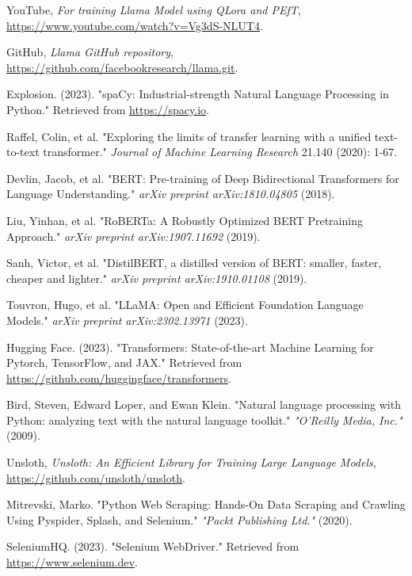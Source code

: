 \documentclass[conference]{IEEEtran}
\begin{document}
\begin{thebibliography}{1}
    YouTube, \emph{For training Llama Model using QLora and PEfT}, \href{https://www.youtube.com/watch?v=Vg3dS-NLUT4}{https://www.youtube.com/watch?v=Vg3dS-NLUT4}.

    GitHub, \emph{Llama GitHub repository}, \href{https://github.com/facebookresearch/llama.git}{https://github.com/facebookresearch/llama.git}.

    Explosion. (2023). "spaCy: Industrial-strength Natural Language Processing in Python." Retrieved from \url{https://spacy.io}.

    Raffel, Colin, et al. "Exploring the limits of transfer learning with a unified text-to-text transformer." \emph{Journal of Machine Learning Research} 21.140 (2020): 1-67.

    Devlin, Jacob, et al. "BERT: Pre-training of Deep Bidirectional Transformers for Language Understanding." \emph{arXiv preprint arXiv:1810.04805} (2018).

    Liu, Yinhan, et al. "RoBERTa: A Robustly Optimized BERT Pretraining Approach." \emph{arXiv preprint arXiv:1907.11692} (2019).

    Sanh, Victor, et al. "DistilBERT, a distilled version of BERT: smaller, faster, cheaper and lighter." \emph{arXiv preprint arXiv:1910.01108} (2019).

    Touvron, Hugo, et al. "LLaMA: Open and Efficient Foundation Language Models." \emph{arXiv preprint arXiv:2302.13971} (2023).

    Hugging Face. (2023). "Transformers: State-of-the-art Machine Learning for Pytorch, TensorFlow, and JAX." Retrieved from \url{https://github.com/huggingface/transformers}.

    Bird, Steven, Edward Loper, and Ewan Klein. "Natural language processing with Python: analyzing text with the natural language toolkit." \emph{"O'Reilly Media, Inc."} (2009).

    Unsloth, \emph{Unsloth: An Efficient Library for Training Large Language Models}, \href{https://github.com/unsloth/unsloth}{https://github.com/unsloth/unsloth}.

    Mitrevski, Marko. "Python Web Scraping: Hands-On Data Scraping and Crawling Using Pyspider, Splash, and Selenium." \emph{"Packt Publishing Ltd."} (2020).

    SeleniumHQ. (2023). "Selenium WebDriver." Retrieved from \url{https://www.selenium.dev}.

\end{thebibliography}
\end{document}
